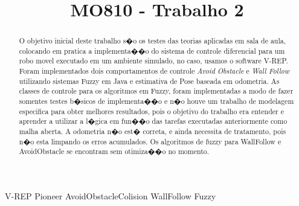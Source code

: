 \documentclass[twoside,conference,a4paper]{IEEEtran}
\begin{document}
\renewcommand{\IEEEkeywordsname}{Palavras-chave}


\title{MO810 - Trabalho 2}
\author{%
				   
}


\maketitle

\begin{abstract}
O objetivo inicial deste trabalho s�o os testes das teorias aplicadas em sala de aula, colocando em pratica a implementa��o do sistema de controle diferencial para um robo movel executado em um ambiente simulado, no caso, usamos o software V-REP. Foram implementados dois comportamentos de controle \textit{Avoid Obstacle} e \textit{Wall Follow} utilizando sistemas Fuzzy em Java e estimativa de Pose baseada em odometria.
As classes de controle para os algoritmos em Fuzzy, foram implementadas a modo de fazer somentes testes b�sicos de implementa��o e n�o houve um trabalho de modelagem especifica para obter melhores resultados, pois o objetivo do trabalho era entender e aprender a utilizar a l�gica em fun��o das tarefas executadas anteriormente como malha aberta. A odometria n�o est� correta, e ainda necessita de tratamento, pois n�o esta limpando os erros acumulados.
Os algoritmos de fuzzy para WallFollow e AvoidObstacle se encontram sem otimiza��o no momento.

\end{abstract}

\begin{IEEEkeywords}
 V-REP Pioneer AvoidObstacleColision WallFollow Fuzzy
\end{IEEEkeywords}
\end{document}
